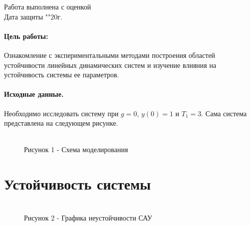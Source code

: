 \documentclass[a4paper, 11pt]{article}
\begin{document}
\begin{titlepage}
		Работа выполнена с оценкой \hspace{1cm} \underline{\hspace{8cm}} \\ 
		\vspace{1cm}
		Дата защиты "\underline{\hspace{0.7cm}}"\hspace{0.2cm}\underline{\hspace{2cm}}\hspace{0.2cm}20\underline{\hspace{0.7cm}}г.

	\end{titlepage}


\paragraph{Цель работы: }Ознакомление с экспериментальными методами построения областей устойчивости линейных динамических систем и изучение влияния на устойчивость системы ее параметров.
\paragraph{Исходные данные.} Необходимо исследовать систему при $g = 0$, $y(0) = 1$ и $T_1 = 3$. Сама система представлена на следующем рисунке.


\begin{figure}[h]
	
	\\
	\centering Рисунок 1 - Схема моделирования
	
\end{figure}
\section{Устойчивость системы}\hfill\par

\begin{figure}[h]

	\\
		\centering Рисунок 2 - Графика неустойчивости САУ
\end{figure}
\end{document}
